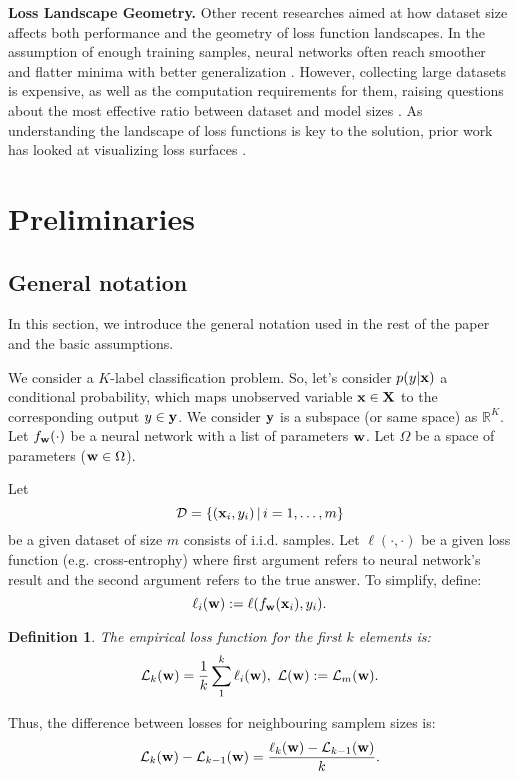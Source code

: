 \documentclass{article}
\newtheorem{definition}{Definition}
\begin{document}
\textbf{Loss Landscape Geometry.}
Other recent researches aimed at how dataset size affects both performance and the geometry of loss function landscapes.
In the assumption of enough training samples, neural networks often reach smoother and flatter minima with better
generalization \cite{wu2017towards}. However, collecting large datasets is expensive, as well as the computation
requirements for them, raising questions about the most effective ratio between dataset and model sizes
\cite{hoffmann2022training}. As understanding the landscape of loss functions is key to the solution, prior work has looked
at visualizing loss surfaces \cite{li2018visualizing}.

\section{Preliminaries}\label{sec:prelim}

\subsection{General notation}

In this section, we introduce the general notation used in the rest of the paper and the basic assumptions.

We consider a $K$-label classification problem.
So, let's consider $p(y|\mathbf{x})$ a conditional probability, which maps unobserved variable $\mathbf{x} \in \mathbf{X}$ to the corresponding
output $y \in \mathbf{y}$. We consider $\mathbf{y}$ is a subspace (or same space) as $\mathbb{R}^K$. Let $f_{\mathbf{w}}(\cdot)$
be a neural network with a list of parameters $\mathbf{w}$. Let $\Omega$ be a space of parameters ($\mathbf{w} \in \Omega$).

Let
$$\mathcal{D} = \left\{ (\mathbf{x}_i, y_i) \, | \, i = 1, \dots, m \right\}$$
be a given dataset of size $m$ consists of i.i.d.
samples. Let $\ell(\cdot, \cdot)$ be a given loss function (e.g. cross-entrophy) where first argument refers to neural network's
result and the second argument refers to the true answer. To simplify, define:
$$\ell_i(\mathbf{w}) := \ell(f_{\mathbf{w}}(\mathbf{x}_i), y_i).$$

\begin{definition}
  The empirical loss function for the first $k$ elements is:
  $$\mathcal{L}_k(\mathbf{w}) = \frac1k \sum\limits_1^k \ell_i(\mathbf{w}), \,\, \mathcal{L}(\mathbf{w}) := \mathcal{L}_m(\mathbf{w}).$$
\end{definition}

Thus, the difference between losses for neighbouring samplem sizes is:
$$\mathcal{L}_{k}(\mathbf{w}) - \mathcal{L}_{k-1}(\mathbf{w}) = \frac{\ell_{k}(\mathbf{w}) - \mathcal{L}_{k-1}(\mathbf{w})}{k}.$$
\end{document}

